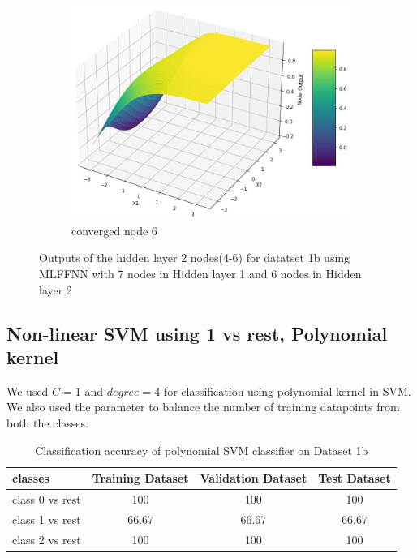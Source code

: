\documentclass[11pt]{article}
\begin{document}
\begin{figure}[h!]
\begin{subfigure}[b]{0.45\textwidth}
	\includegraphics[scale=0.14]{hidden2_n6_c.jpg}
	\caption{converged node 6}
	\label{fig:fig2.1.7.15}
	\end{subfigure}
\caption{Outputs of the hidden layer 2 nodes(4-6) for datatset 1b using MLFFNN with 7 nodes in Hidden layer 1 and 6 nodes in Hidden layer 2}
\label{fig:fig2.1.7}
\end{figure}

\newpage

\subsection{Non-linear SVM using 1 vs rest, Polynomial kernel}

We used $C = 1$ and $degree = 4$ for classification using polynomial kernel in SVM. We also used the parameter to balance the number of training datapoints from both the classes. 
\begin{table}[h!]
\label{tab:tab2.2.1}
\begin{center}
\begin{tabular}{|l|c|c|c|}
\hline
\textbf{classes} & \textbf{Training Dataset} & \textbf{Validation Dataset} &\textbf{Test Dataset}\\
\hline
class 0 vs rest & 100 & 100 & 100\\
\hline
class 1 vs rest & 66.67 & 66.67 & 66.67\\
\hline
class 2 vs rest & 100 & 100 & 100\\
\hline
\end{tabular}
\caption{Classification accuracy of polynomial SVM classifier on Dataset 1b}
\end{center}
\end{table}
\end{document}

